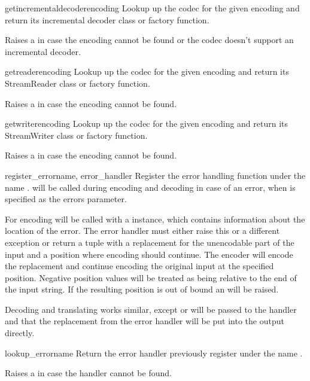 \begin{funcdesc}{getincrementaldecoder}{encoding}
Lookup up the codec for the given encoding and return its incremental decoder
class or factory function.

Raises a  in case the encoding cannot be found or the
codec doesn't support an incremental decoder.
\end{funcdesc}

\begin{funcdesc}{getreader}{encoding}
Lookup up the codec for the given encoding and return its StreamReader
class or factory function.

Raises a  in case the encoding cannot be found.
\end{funcdesc}

\begin{funcdesc}{getwriter}{encoding}
Lookup up the codec for the given encoding and return its StreamWriter
class or factory function.

Raises a  in case the encoding cannot be found.
\end{funcdesc}

\begin{funcdesc}{register_error}{name, error_handler}
Register the error handling function  under the
name .  will be called during encoding
and decoding in case of an error, when  is specified as the
errors parameter.

For encoding  will be called with a
 instance, which contains information about
the location of the error. The error handler must either raise this or
a different exception or return a tuple with a replacement for the
unencodable part of the input and a position where encoding should
continue. The encoder will encode the replacement and continue encoding
the original input at the specified position. Negative position values
will be treated as being relative to the end of the input string. If the
resulting position is out of bound an  will be raised.

Decoding and translating works similar, except 
or  will be passed to the handler and
that the replacement from the error handler will be put into the output
directly.
\end{funcdesc}

\begin{funcdesc}{lookup_error}{name}
Return the error handler previously register under the name .

Raises a  in case the handler cannot be found.
\end{funcdesc}

